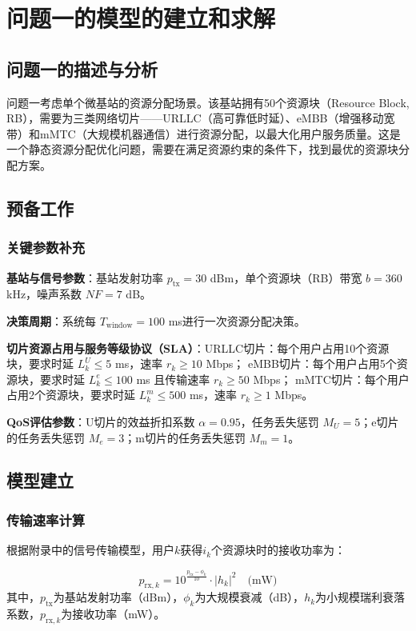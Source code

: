 \section{问题一的模型的建立和求解}
\subsection{问题一的描述与分析}

问题一考虑单个微基站的资源分配场景。该基站拥有50个资源块（Resource Block, RB），需要为三类网络切片——URLLC（高可靠低时延）、eMBB（增强移动宽带）和mMTC（大规模机器通信）进行资源分配，以最大化用户服务质量。这是一个静态资源分配优化问题，需要在满足资源约束的条件下，找到最优的资源块分配方案。

\subsection{预备工作}
\subsubsection{关键参数补充}

\textbf{基站与信号参数}：基站发射功率 $p_{\text{tx}} = 30$ dBm，单个资源块（RB）带宽 $b = 360$ kHz，噪声系数 $NF = 7$ dB。

\textbf{决策周期}：系统每 $T_{\text{window}} = 100$ ms进行一次资源分配决策。

\textbf{切片资源占用与服务等级协议（SLA）}：URLLC切片：每个用户占用10个资源块，要求时延 $L_k^U \leq 5$ ms，速率 $r_k \geq 10$ Mbps；
eMBB切片：每个用户占用5个资源块，要求时延 $L_k^e \leq 100$ ms 且传输速率 $r_k \geq 50$ Mbps；
mMTC切片：每个用户占用2个资源块，要求时延 $L_k^m \leq 500$ ms，速率 $r_k \geq 1$ Mbps。


\textbf{QoS评估参数}：U切片的效益折扣系数 $\alpha = 0.95$，任务丢失惩罚 $M_U = 5$；e切片的任务丢失惩罚 $M_e = 3$；m切片的任务丢失惩罚 $M_m = 1$。



\subsection{模型建立}

\subsubsection{传输速率计算}

根据附录中的信号传输模型，用户$k$获得$i_k$个资源块时的接收功率为：

\begin{equation}
p_{\text{rx},k} = 10^{\frac{p_{\text{tx}} - \phi_k}{10}} \cdot |h_k|^2 \quad \text{(mW)}
\end{equation}
其中，$p_{\text{tx}}$为基站发射功率（dBm），$\phi_k$为大规模衰减（dB），$h_k$为小规模瑞利衰落系数，$p_{\text{rx},k}$为接收功率（mW）。

